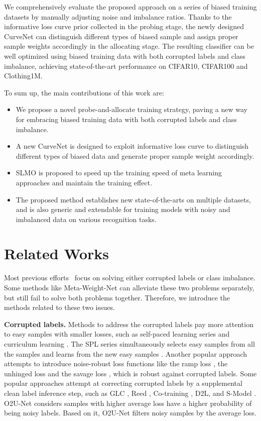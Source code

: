 \documentclass[letterpaper]{article} %
\newcommand{\bd}[1]{\textbf{#1}}
\begin{document}
We comprehensively evaluate the proposed approach on a series of biased training datasets by manually adjusting noise and imbalance ratios. Thanks to the informative loss curve prior collected in the probing stage, the newly designed CurveNet can distinguish different types of biased sample and assign proper sample weights accordingly in the allocating stage. The resulting classifier can be well optimized using biased training data with both corrupted labels and class imbalance, achieving state-of-the-art performance on CIFAR10, CIFAR100 and Clothing1M.

To sum up, the main contributions of this work are:
\begin{itemize}
\item We propose a novel probe-and-allocate training strategy, paving a new way for embracing biased training data with both corrupted labels and class imbalance.
\item A new CurveNet is designed to exploit informative loss curve to distinguish different types of biased data and generate proper sample weight accordingly.
\item SLMO is proposed to speed up the training speed of meta learning approaches and maintain the training effect.
\item The proposed method establishes new state-of-the-arts on multiple datasets, and is also generic and extendable for training models with noisy and imbalanced data on various recognition tasks.
\end{itemize}

\section{Related Works}

Most previous efforts~\cite{kumar2010self,pi2016self,hendrycks2018using,ma2018dimensionality} focus on solving either corrupted labels or class imbalance.
Some methods like Meta-Weight-Net \cite{shu2019meta} can alleviate these two problems separately, but still fail to solve both problems together.
Therefore, we introduce the methods related to these two issues.

\noindent\bd{Corrupted labels.}
Methods to address the corrupted labels pay more attention to easy samples with smaller losses, such as self-paced learning series \cite{kumar2010self,jiang2014easy,jiang2014self} and curriculum learning \cite{bengio2009curriculum}.
The SPL series simultaneously selects easy samples from all the samples and learns from the new easy samples \cite{pi2016self}.
Another popular approach attempts to introduce noise-robust loss functions like the ramp loss \cite{brooks2011support}, the unhinged loss \cite{van2015learning} and the savage loss \cite{masnadi2008design}, which is robust against corrupted labels.
Some popular approaches attempt at correcting corrupted labels by a supplemental clean label inference step, such as GLC \cite{hendrycks2018using}, Reed \cite{reed2014training}, Co-training \cite{han2018co}, D2L\cite{ma2018dimensionality}, and S-Model \cite{goldberger2016training}.
O2U-Net \cite{huang2019o2u} considers samples with higher average loss have a higher probability of being noisy labels.
Based on it, O2U-Net filters noisy samples by the average loss.
\end{document}
